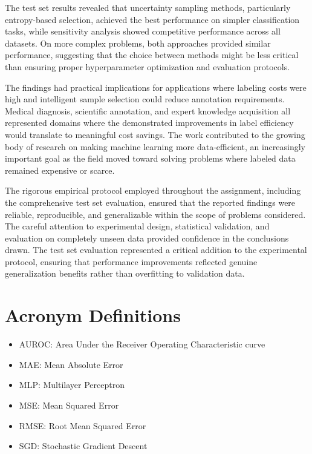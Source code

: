 \documentclass[conference]{IEEEtran}
\begin{document}
The test set results revealed that uncertainty sampling methods, particularly entropy-based selection, achieved the best performance on simpler classification tasks, while sensitivity analysis showed competitive performance across all datasets. On more complex problems, both approaches provided similar performance, suggesting that the choice between methods might be less critical than ensuring proper hyperparameter optimization and evaluation protocols.

The findings had practical implications for applications where labeling costs were high and intelligent sample selection could reduce annotation requirements. Medical diagnosis, scientific annotation, and expert knowledge acquisition all represented domains where the demonstrated improvements in label efficiency would translate to meaningful cost savings. The work contributed to the growing body of research on making machine learning more data-efficient, an increasingly important goal as the field moved toward solving problems where labeled data remained expensive or scarce.

The rigorous empirical protocol employed throughout the assignment, including the comprehensive test set evaluation, ensured that the reported findings were reliable, reproducible, and generalizable within the scope of problems considered. The careful attention to experimental design, statistical validation, and evaluation on completely unseen data provided confidence in the conclusions drawn. The test set evaluation represented a critical addition to the experimental protocol, ensuring that performance improvements reflected genuine generalization benefits rather than overfitting to validation data.




\section*{Acronym Definitions}
\begin{itemize}
\item AUROC: Area Under the Receiver Operating Characteristic curve
\item MAE: Mean Absolute Error
\item MLP: Multilayer Perceptron
\item MSE: Mean Squared Error
\item RMSE: Root Mean Squared Error
\item SGD: Stochastic Gradient Descent
\end{itemize}
\end{document}
